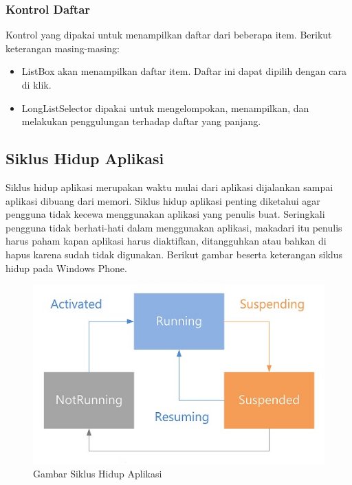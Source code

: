 \subsubsection{Kontrol Daftar}
\label{subsubsec:Kontrol Daftar}
\hspace{0.5cm} Kontrol yang dipakai untuk menampilkan daftar dari beberapa item. Berikut keterangan masing-masing:

\begin{itemize}
	\item ListBox akan menampilkan daftar item. Daftar ini dapat dipilih dengan cara di klik.
	\item LongListSelector dipakai untuk mengelompokan, menampilkan, dan melakukan penggulungan terhadap daftar yang panjang.
\end{itemize}

\subsection{Siklus Hidup Aplikasi}
\label{subsec:Siklus Hidup Aplikasi}
\hspace{0.5cm} Siklus hidup aplikasi merupakan waktu mulai dari aplikasi dijalankan sampai aplikasi dibuang dari memori. Siklus hidup aplikasi penting diketahui agar pengguna tidak kecewa menggunakan aplikasi yang penulis buat. Seringkali pengguna tidak berhati-hati dalam menggunakan aplikasi, makadari itu penulis harus paham kapan aplikasi harus diaktifkan, ditangguhkan atau bahkan di hapus karena sudah tidak digunakan. Berikut gambar beserta keterangan siklus hidup pada Windows Phone.

\begin{figure}[h]
	\centering
		\includegraphics[scale=0.7]{Gambar/lifecycle}
	\caption{Gambar Siklus Hidup Aplikasi}
	\label{fig:Siklus Hidup Aplikasi}
\end{figure}

